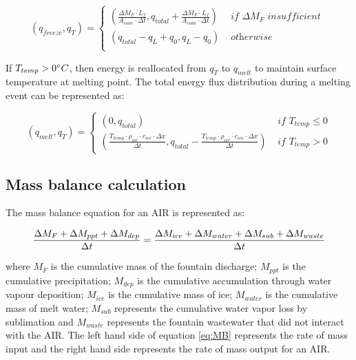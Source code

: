 \begin{equation}
	(q_{freeze}, q_{T}) = \left\{ \begin{array}{ll}
		(\frac{\Delta M_{F} \cdot L_f
		}{A_{cone} \cdot \Delta t}
		, q_{total}+\frac{\Delta M_{F} \cdot L_f
		}{A_{cone} \cdot \Delta t})          & \textit{ if  } \Delta M_{F} \textit{ insufficient }\\
		(q_{total}-q_{L}+q_{0}, q_{L}-q_{0}) & \textit{ otherwise }                                                                      \\
	\end{array} \right.
\end{equation}

If $T_{temp} > 0 ^{\circ} C$, then energy is reallocated from $q_{T}$ to $q_{melt}$ to maintain surface
temperature at melting point. The total energy flux distribution during a melting event can be represented as:

\begin{equation}
	(q_{melt}, q_{T}) = \left\{ \begin{array}{ll}
		(0, q_{total})
    & \textit{ if } T_{temp} \leq 0 \\
		(\frac{T_{temp} \cdot \rho_{ice} \cdot c_{ice} \cdot \Delta x}{\Delta t}, q_{total}-\frac{T_{temp} \cdot \rho_{ice} \cdot c_{ice} \cdot \Delta x}{\Delta t}  ) & \textit{ if } T_{temp} > 0
	\end{array} \right.
\end{equation}


\subsection{Mass balance calculation}

The mass balance equation for an AIR is represented as:

\begin{equation}
	\frac{\Delta M_{F} + \Delta M_{ppt} + \Delta M_{dep}}{\Delta t} = \frac{\Delta M_{ice} +\Delta M_{water} +
		\Delta M_{sub} + \Delta M_{waste}}{\Delta t}  \\
	\label{eq:MB}
\end{equation}

where $M_{F}$ is the cumulative mass of the fountain discharge; $M_{ppt}$ is the cumulative precipitation;  $M_{dep}$ is the cumulative
accumulation through water vapour deposition; $M_{ice}$ is the cumulative mass of ice; $M_{water}$ is the cumulative
mass of melt water; $M_{sub}$ represents the cumulative water vapor loss by sublimation and $M_{waste}$ represents the
fountain wastewater that did not interact with the AIR. The left hand side of equation \ref{eq:MB} represents the rate of
mass input and the right hand side represents the rate of mass output for an AIR.


